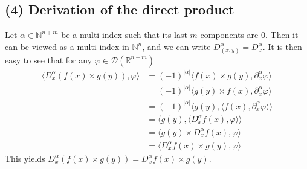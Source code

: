 \documentclass[11pt,a4paper]{article}
\newcommand{\ph}{\varphi}
\newcommand{\N}{\mathbb{N}}
\newcommand{\R}{\mathbb{R}}
\newcommand{\1}{\mathbbm{1}}
\begin{document}
\subsection*{(4) Derivation of the direct product}
Let $\alpha \in \N^{n+m}$ be a multi-index such that its last $m$ components are $0$. Then it can be viewed as a multi-index in $\N^n$, and we can write $D^\alpha_{(x,y)} = D^\alpha_x$. It is then easy to see that for any $\ph \in \mathcal{D}(\R^{n+m})$
\begin{align*}
\langle D^\alpha_x (f(x) \times g(y)) , \ph \rangle
& = (-1)^{|\alpha|} \langle f(x) \times g(y) , \partial^\alpha_x \ph \rangle \\
& = (-1)^{|\alpha|} \langle g(y) \times f(x) , \partial^\alpha_x \ph \rangle \\
& = (-1)^{|\alpha|} \langle g(y) , \langle f(x) , \partial^\alpha_x \ph \rangle \rangle \\
& = \langle g(y) , \langle D^\alpha_x f(x) , \ph \rangle \rangle \\
& = \langle g(y) \times D^\alpha_x f(x) , \ph \rangle \\
& = \langle D^\alpha_x f(x) \times g(y) , \ph \rangle 
\end{align*} 
This yields $D^\alpha_x (f(x) \times g(y)) = D^\alpha_x f(x) \times g(y)$.
\end{document}
